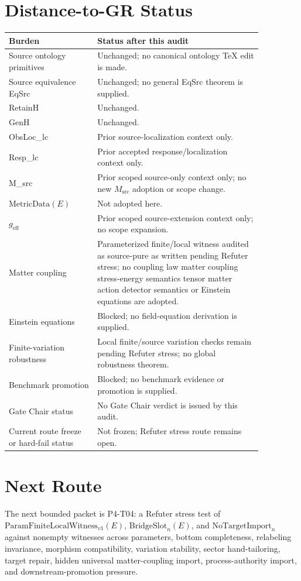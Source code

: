 \documentclass[11pt]{article}
\newcommand{\MetricData}{\mathrm{MetricData}}
\newcommand{\geff}{g_{\mathrm{eff}}}
\newcommand{\Msrc}{M_{\mathrm{src}}}
\newcommand{\PFLFW}{\mathrm{ParamFiniteLocalWitness}_{v1}}
\newcommand{\BridgeSlot}{\mathrm{BridgeSlot}}
\newcommand{\NoTargetImport}{\mathrm{NoTargetImport}}
\begin{document}
\section{Distance-to-GR Status}

\begin{longtable}{p{0.30\linewidth}p{0.56\linewidth}}
\toprule
Burden & Status after this audit \\
\midrule
Source ontology primitives & Unchanged; no canonical ontology TeX edit is made. \\
Source equivalence EqSrc & Unchanged; no general EqSrc theorem is supplied. \\
RetainH & Unchanged. \\
GenH & Unchanged. \\
ObsLoc\_lc & Prior source-localization context only. \\
Resp\_lc & Prior accepted response/localization context only. \\
M\_src & Prior scoped source-only context only; no new \(\Msrc\) adoption or scope change. \\
\(\MetricData(E)\) & Not adopted here. \\
\(\geff\) & Prior scoped source-extension context only; no scope expansion. \\
Matter coupling & Parameterized finite/local witness audited as source-pure as written pending Refuter stress; no coupling law matter coupling stress-energy semantics tensor matter action detector semantics or Einstein equations are adopted. \\
Einstein equations & Blocked; no field-equation derivation is supplied. \\
Finite-variation robustness & Local finite/source variation checks remain pending Refuter stress; no global robustness theorem. \\
Benchmark promotion & Blocked; no benchmark evidence or promotion is supplied. \\
Gate Chair status & No Gate Chair verdict is issued by this audit. \\
Current route freeze or hard-fail status & Not frozen; Refuter stress route remains open. \\
\bottomrule
\end{longtable}

\section{Next Route}

The next bounded packet is P4-T04: a Refuter stress test of
\(\PFLFW(E)\), \(\BridgeSlot_n(E)\), and \(\NoTargetImport_n\) against
nonempty witnesses across parameters, bottom completeness, relabeling
invariance, morphism compatibility, variation stability, sector
hand-tailoring, target repair, hidden universal matter-coupling import,
process-authority import, and downstream-promotion pressure.
\end{document}
